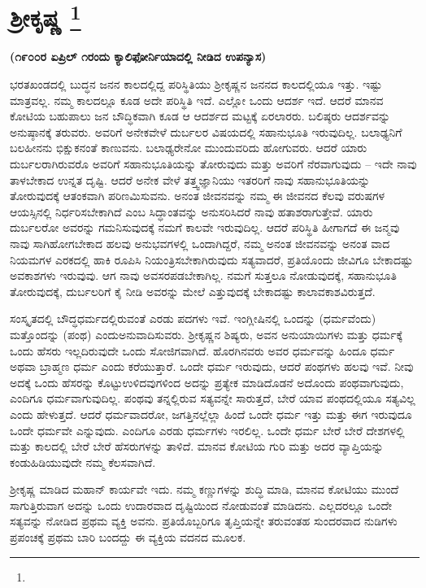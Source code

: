 
\chapter[ಶ‍್ರೀಕೃಷ್ಣ ]{ಶ‍್ರೀಕೃಷ್ಣ \protect\footnote{}}

\centerline{\textbf{(೧೯೦೦ರ ಏಪ್ರಿಲ್​ ೧ರಂದು ಕ್ಯಾಲಿಫೋರ್ನಿಯಾದಲ್ಲಿ ನೀಡಿದ ಉಪನ್ಯಾಸ)}}

ಭರತಖಂಡದಲ್ಲಿ ಬುದ್ಧನ ಜನನ ಕಾಲದಲ್ಲಿದ್ದ ಪರಿಸ್ಥಿತಿಯು ಶ‍್ರೀಕೃಷ್ಣನ ಜನನದ ಕಾಲದಲ್ಲಿಯೂ ಇತ್ತು. ಇಷ್ಟು ಮಾತ್ರವಲ್ಲ. ನಮ್ಮ ಕಾಲದಲ್ಲೂ ಕೂಡ ಅದೇ ಪರಿಸ್ಥಿತಿ ಇದೆ. ಎಲ್ಲೋ ಒಂದು ಆದರ್ಶ ಇದೆ. ಆದರೆ ಮಾನವ ಕೋಟಿಯ ಬಹುಪಾಲು ಜನ ಬೌದ್ಧಿಕವಾಗಿ ಕೂಡ ಆ ಆದರ್ಶದ ಮಟ್ಟಕ್ಕೆ ಏರಲಾರರು. ಬಲಿಷ್ಠರು ಆದರ್ಶವನ್ನು ಅನುಷ್ಠಾನಕ್ಕೆ ತರುವರು. ಅವರಿಗೆ ಅನೇಕವೇಳೆ ದುರ್ಬಲರ ವಿಷಯದಲ್ಲಿ ಸಹಾನುಭೂತಿ ಇರುವುದಿಲ್ಲ. ಬಲಾಢ್ಯನಿಗೆ ಬಲಹೀನನು ಭಿಕ್ಷುಕನಂತೆ ಕಾಣುವನು. ಬಲಾಢ್ಯರೇನೋ ಮುಂದುವರಿದು ಹೋಗುವರು. ಆದರೆ ಯಾರು ದುರ್ಬಲರಾಗಿರುವರೊ ಅವರಿಗೆ ಸಹಾನುಭೂತಿಯನ್ನು ತೋರುವುದು ಮತ್ತು ಅವರಿಗೆ ನೆರವಾಗುವುದು – ಇದೇ ನಾವು ತಾಳಬೇಕಾದ ಉನ್ನತ ದೃಷ್ಟಿ. ಆದರೆ ಅನೇಕ ವೇಳೆ ತತ್ತ್ವಜ್ಞಾನಿಯು ಇತರರಿಗೆ ನಾವು ಸಹಾನುಭೂತಿಯನ್ನು ತೋರುವುದಕ್ಕೆ ಆತಂಕವಾಗಿ ಪರಿಣಮಿಸುವನು. ಅನಂತ ಜೀವನವನ್ನು ನಮ್ಮ ಈ ಜೀವನದ ಕೆಲವು ವರುಷಗಳ ಆಯಸ್ಸಿನಲ್ಲಿ ನಿರ್ಧರಿಸಬೇಕಾಗಿದೆ ಎಂಬ ಸಿದ್ಧಾಂತವನ್ನು ಅನುಸರಿಸಿದರೆ ನಾವು ಹತಾಶರಾಗುತ್ತೇವೆ. ಯಾರು ದುರ್ಬಲರೋ ಅವರನ್ನು ಗಮನಿಸುವುದಕ್ಕೆ ನಮಗೆ ಕಾಲವೇ ಇರುವುದಿಲ್ಲ. ಆದರೆ ಪರಿಸ್ಥಿತಿ ಹೀಗಾಗದೆ ಈ ಜನ್ಮವು ನಾವು ಸಾಗಿಹೋಗಬೇಕಾದ ಹಲವು ಅನುಭವಗಳಲ್ಲಿ ಒಂದಾಗಿದ್ದರೆ, ನಮ್ಮ ಅನಂತ ಜೀವನವನ್ನು ಅನಂತ ವಾದ ನಿಯಮಗಳ ಎರಕದಲ್ಲಿ ಹಾಕಿ ರೂಪಿಸಿ ನಿಯಂತ್ರಿಸಬೇಕಾಗಿರುವುದು ಸತ್ಯವಾದರೆ, ಪ್ರತಿಯೊಂದು ಜೀವಿಗೂ ಬೇಕಾದಷ್ಟು ಅವಕಾಶಗಳು ಇರುವುವು. ಆಗ ನಾವು ಅವಸರಪಡಬೇಕಾಗಿಲ್ಲ. ನಮಗೆ ಸುತ್ತಲೂ ನೋಡುವುದಕ್ಕೆ, ಸಹಾನುಭೂತಿ ತೋರುವುದಕ್ಕೆ, ದುರ್ಬಲರಿಗೆ ಕೈ ನೀಡಿ ಅವರನ್ನು ಮೇಲೆ ಎತ್ತುವುದಕ್ಕೆ ಬೇಕಾದಷ್ಟು ಕಾಲಾವಕಾಶವಿರುತ್ತದೆ.

ಸಂಸ್ಕೃತದಲ್ಲಿ ಬೌದ್ಧಧರ್ಮದಲ್ಲಿರುವಂತೆ ಎರಡು ಪದಗಳು ಇವೆ. ಇಂಗ್ಲೀಷಿನಲ್ಲಿ ಒಂದನ್ನು  (ಧರ್ಮವೆಂದು) ಮತ್ತೊಂದನ್ನು  (ಪಂಥ) ಎಂದು\break ಅನುವಾದಿಸುವರು. ಶ‍್ರೀಕೃಷ್ಣನ ಶಿಷ್ಯರು, ಅವನ ಅನುಯಾಯಿಗಳು ಮತ್ತು ಧರ್ಮಕ್ಕೆ ಒಂದು ಹೆಸರು ಇಲ್ಲದಿರುವುದೇ ಒಂದು ಸೋಜಿಗವಾಗಿದೆ. ಹೊರಗಿನವರು ಅವರ ಧರ್ಮವನ್ನು ಹಿಂದೂ ಧರ್ಮ ಅಥವಾ ಬ್ರಾಹ್ಮಣ ಧರ್ಮ ಎಂದು ಕರೆಯುತ್ತಾರೆ. ಒಂದೇ ಧರ್ಮ ಇರುವುದು, ಆದರೆ ಪಂಥಗಳು ಹಲವು ಇವೆ. ನೀವು ಅದಕ್ಕೆ ಒಂದು ಹೆಸರನ್ನು ಕೊಟ್ಟು\break ಉಳಿದವುಗಳಿಂದ ಅದನ್ನು ಪ್ರತ್ಯೇಕ ಮಾಡಿದೊಡನೆ ಅದೊಂದು ಪಂಥವಾಗುವುದು, ಎಂದಿಗೂ ಧರ್ಮವಾಗುವುದಿಲ್ಲ. ಪಂಥವು ತನ್ನಲ್ಲಿರುವ ಸತ್ಯವನ್ನೇ ಸಾರುತ್ತದೆ, ಬೇರೆ ಯಾವ ಪಂಥದಲ್ಲಿಯೂ ಸತ್ಯವಿಲ್ಲ ಎಂದು ಹೇಳುತ್ತದೆ. ಆದರೆ ಧರ್ಮವಾದರೋ, ಜಗತ್ತಿನಲ್ಲೆಲ್ಲಾ ಹಿಂದೆ ಒಂದೇ ಧರ್ಮ ಇತ್ತು ಮತ್ತು ಈಗ ಇರುವುದೂ ಒಂದೇ ಧರ್ಮವೇ ಎನ್ನುವುದು. ಎಂದಿಗೂ ಎರಡು ಧರ್ಮಗಳು ಇರಲಿಲ್ಲ. ಒಂದೇ ಧರ್ಮ ಬೇರೆ ಬೇರೆ ದೇಶಗಳಲ್ಲಿ ಮತ್ತು ಕಾಲದಲ್ಲಿ ಬೇರೆ ಬೇರೆ ಹೆಸರುಗಳನ್ನು ತಾಳಿದೆ. ಮಾನವ ಕೋಟಿಯ ಗುರಿ ಮತ್ತು ಅದರ ವ್ಯಾಪ್ತಿಯನ್ನು ಕಂಡುಹಿಡಿಯುವುದೇ ನಮ್ಮ ಕೆಲಸವಾಗಿದೆ.

ಶ‍್ರೀಕೃಷ್ಣ ಮಾಡಿದ ಮಹಾನ್​ ಕಾರ್ಯವೇ ಇದು. ನಮ್ಮ ಕಣ್ಣುಗಳನ್ನು ಶುದ್ಧಿ ಮಾಡಿ, ಮಾನವ ಕೋಟಿಯು ಮುಂದೆ ಸಾಗುತ್ತಿರುವಾಗ ಅದನ್ನು ಒಂದು ಉದಾರವಾದ ದೃಷ್ಟಿಯಿಂದ ನೋಡುವಂತೆ ಮಾಡಿದನು. ಎಲ್ಲದರಲ್ಲೂ ಒಂದೇ ಸತ್ಯವನ್ನು ನೋಡಿದ ಪ್ರಥಮ ವ್ಯಕ್ತಿ ಅವನು. ಪ್ರತಿಯೊಬ್ಬರಿಗೂ ತೃಪ್ತಿಯನ್ನೇ ತರುವಂತಹ ಸುಂದರವಾದ ನುಡಿಗಳು ಪ್ರಪಂಚಕ್ಕೆ ಪ್ರಥಮ ಬಾರಿ ಬಂದದ್ದು ಈ ವ್ಯಕ್ತಿಯ ವದನದ ಮೂಲಕ.

